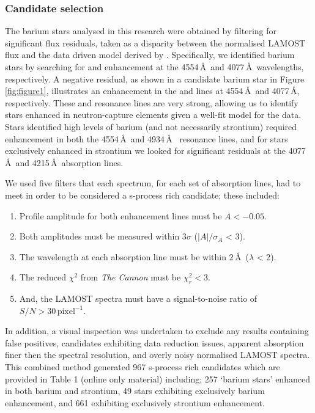 \documentclass[a4paper,fleqn,usenatbib]{mnras}
\begin{document}
\subsubsection{Candidate selection} \label{sec:cand}
The barium stars analysed in this research were obtained by filtering for significant flux residuals, taken as a disparity between the normalised LAMOST flux and the data driven model derived by \citet{ho2017}. Specifically, we identified barium stars by searching for  and  enhancement at the 4554\,\AA\ and 4077\,\AA\ wavelengths, respectively. A negative residual, as shown in a candidate barium star in Figure \ref{fig:figure1}, illustrates an enhancement in the  and  lines at 4554\,\AA\, and 4077\,\AA, respectively. These  and  resonance lines are very strong, allowing us to identify stars enhanced in neutron-capture elements given a well-fit model for the data. Stars identified high levels of barium (and not necessarily strontium) required enhancement in both the 4554\,\AA\ and 4934\,\AA\  resonance lines, and for stars exclusively enhanced in strontium we looked for significant residuals at the 4077\,\AA\ and 4215\,\AA\ absorption lines.  

We used five filters that each spectrum, for each set of absorption lines, had to meet in order to be considered a s-process rich candidate; these included:

\renewcommand\labelenumi{(\roman{enumi})}
\renewcommand\theenumi\labelenumi

\begin{enumerate} 
\item Profile amplitude for both enhancement lines must be $A < -0.05$.
\item Both amplitudes must be measured within 3$\sigma$ ($|A|/\sigma _A$ < 3).
\item The wavelength at each absorption line must be within 2\,\AA\ ($\lambda$ < 2).
\item The reduced $\chi^2$ from \emph{The Cannon} must be $\chi_r^2 < 3$.
\item And, the LAMOST spectra must have a signal-to-noise ratio of $S/N > 30\,\textrm{pixel}^{-1}$.
\end{enumerate}
In addition, a visual inspection was undertaken to exclude any results containing false positives, candidates exhibiting data reduction issues, apparent absorption finer then the spectral resolution, and overly noisy normalised LAMOST spectra. This combined method generated 967 s-process rich candidates which are provided in Table 1 (online only material) including; 257 `barium stars' enhanced in both barium and strontium, 49 stars exhibiting exclusively barium enhancement, and 661 exhibiting exclusively strontium enhancement. 
\end{document}
